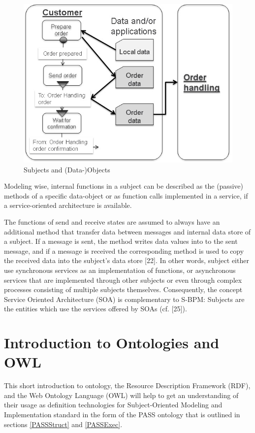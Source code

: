 \begin{figure}[htbp]
	\centering
	\includegraphics[width=0.9\linewidth]{Figures/Ontology/SubjectExecution/SUbjectObject}
	\caption[Subjects and (Data-)Objects]{Subjects and (Data-)Objects}
	\label{fig:subjectobject}
\end{figure}


Modeling wise, internal functions in a subject can be described as the (passive) methods of a specific data-object or as function calls implemented in a service, if a service-oriented architecture is available.

The functions of send and receive states are assumed to always have an additional method that transfer data between messages and internal data store of a subject. If a message is sent, the method writes data values into to the sent message, and if a message is received the corresponding method is used to copy the received data into the subject's data store [22]. In other words, subject either use synchronous services as an implementation of functions, or asynchronous services that are implemented through other subjects or even through complex processes consisting of multiple subjects themselves. Consequently, the concept Service Oriented Architecture (SOA) is complementary to S-BPM: Subjects are the entities which use the services offered by SOAs (cf. [25]).

\section{Introduction to Ontologies and OWL }
\label{IntroOntology}

This short introduction to ontology, the Resource Description Framework (RDF), and the Web Ontology Language (OWL) will help to get an understanding of their usage as definition technologies for Subject-Oriented Modeling and Implementation standard in the form of the PASS ontology that is outlined in sections \ref{PASSStruct} and \ref{PASSExec}.

